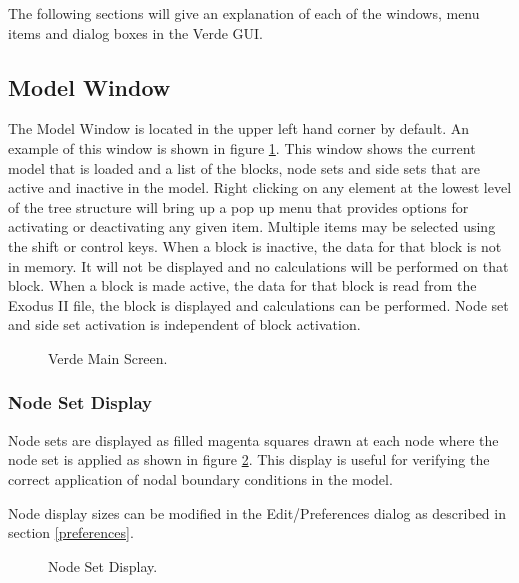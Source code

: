 \documentclass[10pt]{report}
\begin{document}
The following sections will give an explanation of each of the windows, 
menu items and dialog boxes in the Verde GUI.

\subsection{Model Window}
\label{model_window}

The Model Window is located in the 
upper left hand corner by default.  An example of this window is 
shown in figure \ref{fig:model_window}.  This window shows the current model 
that is loaded and a list of the blocks, node sets and side sets 
that are active and inactive in 
the model.  Right clicking on any element at the lowest level of the
tree structure will bring up a pop up menu that provides options for
activating or deactivating any given item.  Multiple items may be
selected using the shift or control keys.
When a block is inactive, the data 
for that block is not in memory.  It will not be displayed and no 
calculations will be performed on that block.  When a block is made 
active, the data for that block is read from the Exodus II file, the 
block is displayed and calculations can be performed.  Node set and
side set activation is independent of block activation.

\htmlrule
\begin{figure}[tbh]
  \begin{center}
              {}
    \caption{Verde Main Screen.}
    \label{fig:model_window}
  \end{center}
\end{figure}     
\htmlrule


\subsubsection{Node Set Display}
\label{nodesets}

Node sets are displayed as filled magenta squares drawn at each node where the
node set is applied as shown in figure \ref{fig:nodesets}. This display
is useful for verifying the correct application of nodal boundary conditions
in the model.

Node display sizes can be modified in the Edit/Preferences dialog as
described in section \ref{preferences}.

\htmlrule
\begin{figure}[tb]
  \begin{center}
              {}
    \caption{Node Set Display.}
    \label{fig:nodesets}
  \end{center}
\end{figure}     
\htmlrule
\end{document}
